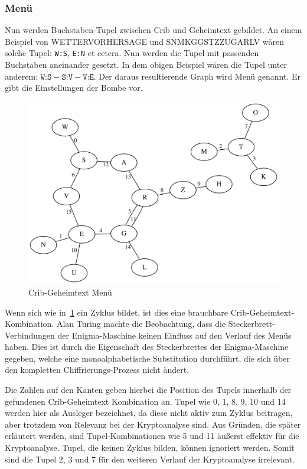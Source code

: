 \subsubsection{Menü}\label{subsubsec:menu}
Nun werden Buchstaben-Tupel zwischen Crib und Geheimtext gebildet.
An einem Beispiel von \glqq WETTERVORHERSAGE\grqq{} und \glqq SNMKGGSTZZUGARLV\grqq{} wären solche Tupel: \texttt{W:S}, \texttt{E:N} et cetera.
Nun werden die Tupel mit passenden Buchstaben aneinander gesetzt. 
In dem obigen Beispiel wären die Tupel unter anderem: $\texttt{W:S} - \texttt{S:V} - \texttt{V:E}$.
Der daraus resultierende Graph wird \glqq Menü\grqq{} genannt.
Er gibt die Einstellungen der Bombe vor.
\nopagebreak
\begin{figure}[htbp]
	\centering
	\includegraphics[width=.6\linewidth]{Turing Bomb/crib_cipher_cycle}
	\caption{Crib-Geheimtext Menü}
	\label{fig:crib_cipher_cycle}
\end{figure}

Wenn sich wie in~\cref{fig:crib_cipher_cycle} ein Zyklus bildet, ist dies eine brauchbare Crib-Geheimtext-Kombination.
Alan Turing machte die Beobachtung, dass die Steckerbrett-Verbindungen der Enigma-Maschine keinen Einfluss auf den Verlauf des Menüs haben.
Dies ist durch die Eigenschaft des Steckerbrettes der Enigma-Maschine gegeben, welche eine monoalphabetische Substitution durchführt, die sich über den kompletten Chiffrierungs-Prozess nicht ändert.

Die Zahlen auf den Kanten geben hierbei die Position des Tupels innerhalb der gefundenen Crib-Geheimtext Kombination an.
Tupel wie 0, 1, 8, 9, 10 und 14 werden hier als \glqq Ausleger\grqq{} bezeichnet, da diese nicht aktiv zum Zyklus beitragen, aber trotzdem von Relevanz bei der Kryptoanalyse sind.
Aus Gründen, die später erläutert werden, sind Tupel-Kombinationen wie 5 und 11 äußerst effektiv für die Kryptoanalyse.
Tupel, die keinen Zyklus bilden, können ignoriert werden.
Somit sind die Tupel 2, 3 und 7 für den weiteren Verlauf der Kryptoanalyse irrelevant.


